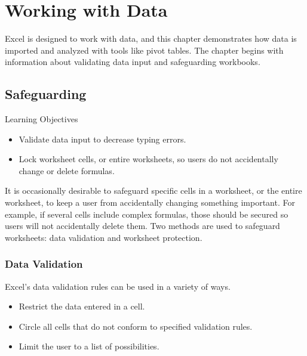 \chapter{Working with Data}\label{ch07:data}

Excel is designed to work with data, and this chapter demonstrates how data is imported and analyzed with tools like pivot tables. The chapter begins with information about validating data input and safeguarding workbooks. 

\section{Safeguarding}

\begin{center}
	\begin{objbox}{Learning Objectives}
		\begin{itemize}
			\setlength{\itemsep}{0pt}
			\setlength{\parskip}{0pt}
			\setlength{\parsep}{0pt}
			
			\item Validate data input to decrease typing errors.
			\item Lock worksheet cells, or entire worksheets, so users do not accidentally change or delete formulas.
			
		\end{itemize}
	\end{objbox}
\end{center}

It is occasionally desirable to safeguard specific cells in a worksheet, or the entire worksheet, to keep a user from accidentally changing something important. For example, if several cells include complex formulas, those should be secured so users will not accidentally delete them. Two methods are used to safeguard worksheets: data validation and worksheet protection. 

\subsection{Data Validation}

Excel's data validation rules can be used in a variety of ways.

\begin{itemize}
	\item Restrict the data entered in a cell.
	\item Circle all cells that do not conform to specified validation rules.
	\item Limit the user to a list of possibilities.
\end{itemize}

